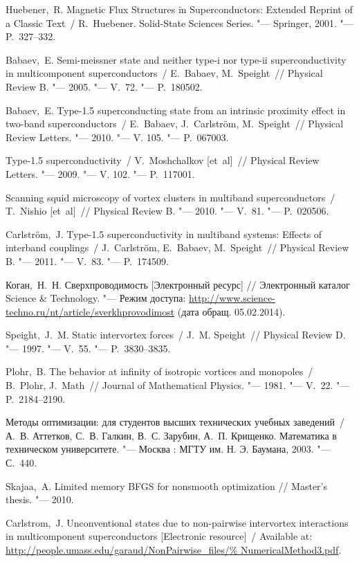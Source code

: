 \begin{thebibliography}{10}
     Huebener,~R. Magnetic Flux Structures in Superconductors: 
        Extended Reprint of a Classic Text~/ R.~Huebener. 
        Solid-State Sciences Series. "--- Springer, 2001. "--- P.~327--332.

     Babaev,~E. Semi-meissner state and neither type-i nor 
        type-ii superconductivity in multicomponent superconductors~/ 
        E.~Babaev, M.~Speight~// Physical Review B. "--- 2005. "---
        V.~72. "--- P.~180502.

     Babaev,~E. Type-1.5 superconducting state from an 
        intrinsic proximity effect in two-band superconductors~/ 
        E.~Babaev, J.~Carlstr\"om, M.~Speight~// Physical Review Letters. "---
        2010. "--- V. 105. "--- P.~067003.

     Type-1.5 superconductivity~/ V.~Moshchalkov [et~al]~// 
        Physical Review Letters. "--- 2009. "--- V. 102. "--- P.~117001.

     Scanning squid microscopy of vortex clusters in multiband 
        superconductors~/ T.~Nishio [et~al]~// Physical Review B. "---
        2010. "--- V.~81. "--- P.~020506.

     Carlstr\"om,~J. Type-1.5 superconductivity in multiband 
        systems: Effects of interband couplings~/ J.~Carlstr\"om, E.~Babaev, 
        M.~Speight~// Physical Review B. "--- 2011. "--- V.~83. "--- 
        P.~174509.

     Коган,~Н.~Н. Сверхпроводимость 
        [Электронный ресурс] // Электронный каталог Science \& Technology. "---
        Режим доступа: 
        \url{http://www.science-techno.ru/nt/article/sverkhprovodimost} 
        (дата обращ. 05.02.2014).

     Speight,~J.~M. Static intervortex forces~/ 
        J.~M. Speight~// Physical Review D. "--- 1997. "--- V.~55. "--- 
        P.~3830--3835.

     Plohr,~B. The behavior at infinity of isotropic vortices 
        and monopoles~/ B.~Plohr, J.~Math~// 
        Journal of Mathematical Physics. "--- 1981. "--- V.~22. "--- 
        P.~2184--2190.

     Методы оптимизации: для студентов высших технических 
        учебных заведений~/ А.~В. Аттетков, С.~В. Галкин, В.~С. Зарубин, 
        А.~П. Крищенко. Математика в техническом университете. "--- 
        Москва : МГТУ им. Н. Э. Баумана, 2003. "--- С.~440.

     Skajaa,~A. Limited memory BFGS for nonsmooth 
        optimization // Master's thesis. "--- 2010.

     Carlstrom,~J. Unconventional states due to 
        non-pairwise intervortex interactions in multicomponent 
        superconductors [Electronic resource]~/ Available at: 
        \url{http://people.umass.edu/garaud/NonPairwise_files/%
            NumericalMethod3.pdf}.
\end{thebibliography}

\newpage